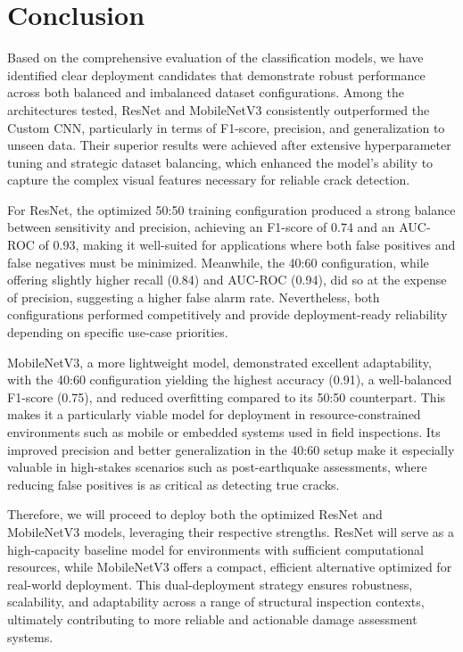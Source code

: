 \section{Conclusion}
Based on the comprehensive evaluation of the classification models, we have identified clear deployment candidates that demonstrate robust performance across both balanced and imbalanced dataset configurations. Among the architectures tested, ResNet and MobileNetV3 consistently outperformed the Custom CNN, particularly in terms of F1-score, precision, and generalization to unseen data. Their superior results were achieved after extensive hyperparameter tuning and strategic dataset balancing, which enhanced the model's ability to capture the complex visual features necessary for reliable crack detection.

For ResNet, the optimized 50:50 training configuration produced a strong balance between sensitivity and precision, achieving an F1-score of 0.74 and an AUC-ROC of 0.93, making it well-suited for applications where both false positives and false negatives must be minimized. Meanwhile, the 40:60 configuration, while offering slightly higher recall (0.84) and AUC-ROC (0.94), did so at the expense of precision, suggesting a higher false alarm rate. Nevertheless, both configurations performed competitively and provide deployment-ready reliability depending on specific use-case priorities.

MobileNetV3, a more lightweight model, demonstrated excellent adaptability, with the 40:60 configuration yielding the highest accuracy (0.91), a well-balanced F1-score (0.75), and reduced overfitting compared to its 50:50 counterpart. This makes it a particularly viable model for deployment in resource-constrained environments such as mobile or embedded systems used in field inspections. Its improved precision and better generalization in the 40:60 setup make it especially valuable in high-stakes scenarios such as post-earthquake assessments, where reducing false positives is as critical as detecting true cracks.

Therefore, we will proceed to deploy both the optimized ResNet and MobileNetV3 models, leveraging their respective strengths. ResNet will serve as a high-capacity baseline model for environments with sufficient computational resources, while MobileNetV3 offers a compact, efficient alternative optimized for real-world deployment. This dual-deployment strategy ensures robustness, scalability, and adaptability across a range of structural inspection contexts, ultimately contributing to more reliable and actionable damage assessment systems.

